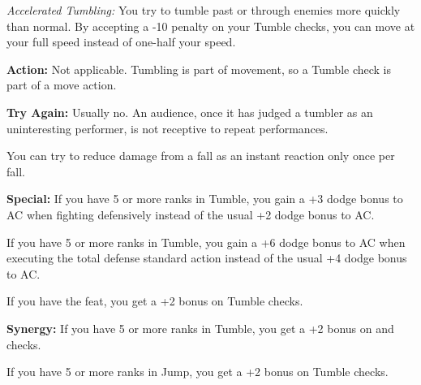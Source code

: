 \textit{Accelerated Tumbling:} You try to tumble past or through enemies more quickly 
than normal. By accepting a -10 penalty on your Tumble checks, you can move at 
your full speed instead of one-half your speed.

\textbf{Action:} Not applicable. Tumbling is part of movement, so a Tumble check 
is part of a move action.

\textbf{Try Again:} Usually no. An audience, once it has judged a tumbler as an 
uninteresting performer, is not receptive to repeat performances.

You can try to reduce damage from a fall as an instant reaction only once per fall.

\textbf{Special:} If you have 5 or more ranks in Tumble, you gain a +3 dodge bonus 
to AC when fighting defensively instead of the usual +2 dodge bonus to AC.

If you have 5 or more ranks in Tumble, you gain a +6 dodge bonus to AC when executing 
the total defense standard action instead of the usual +4 dodge bonus to AC.

If you have the  feat, you get a +2 bonus on Tumble checks.

\textbf{Synergy:} If you have 5 or more ranks in Tumble, you get a +2 bonus on 
 and  checks.

If you have 5 or more ranks in Jump, you get a +2 bonus on Tumble checks.
